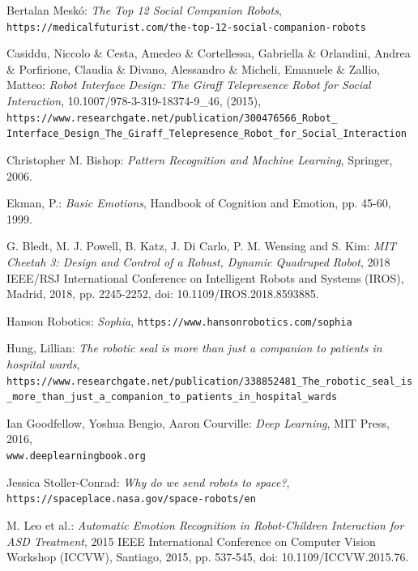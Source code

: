 \documentclass[runningheads,a4paper,12pt]{report}
\begin{document}
\begin{thebibliography}{9}

Bertalan Mesk\'o:
\textit{The Top 12 Social Companion Robots},
\texttt{https://medicalfuturist.com/the-top-12-social-companion-robots}

Casiddu, Niccolo \& Cesta, Amedeo \& Cortellessa, Gabriella \& Orlandini, Andrea \& Porfirione, Claudia \& Divano, Alessandro \& Micheli, Emanuele \& Zallio, Matteo: 
\textit{Robot Interface Design: The Giraff Telepresence Robot for Social Interaction}, 10.1007/978-3-319-18374-9\_46, (2015),
\texttt{https://www.researchgate.net/publication/300476566\_Robot\_
Interface\_Design\_The\_Giraff\_Telepresence\_Robot\_for\_Social\_Interaction}

Christopher M. Bishop:
\textit{Pattern Recognition and Machine Learning}, 
Springer,
2006.

Ekman, P.: 
\textit{Basic Emotions}, Handbook of Cognition and Emotion, pp. 45-60, 1999.

G. Bledt, M. J. Powell, B. Katz, J. Di Carlo, P. M. Wensing and S. Kim:
\textit{MIT Cheetah 3: Design and Control of a Robust, Dynamic Quadruped Robot}, 
2018 IEEE/RSJ International Conference on Intelligent Robots and Systems (IROS), Madrid, 2018, pp. 2245-2252, doi: 10.1109/IROS.2018.8593885.

Hanson Robotics:
\textit{Sophia},
\texttt{https://www.hansonrobotics.com/sophia}

Hung, Lillian:
\textit{The robotic seal is more than just a companion to patients in hospital wards}, \texttt{https://www.researchgate.net/publication/338852481\_The\_robotic\_seal\_is\_more\_than\_just\_a\_companion\_to\_patients\_in\_hospital\_wards}

Ian Goodfellow, Yoshua Bengio, Aaron Courville:
\textit{Deep Learning},
MIT Press,
2016,
\\\texttt{www.deeplearningbook.org}

Jessica Stoller-Conrad:
\textit{Why do we send robots to space?}, 
\texttt{https://spaceplace.nasa.gov/space-robots/en}

M. Leo et al.:
\textit{Automatic Emotion Recognition in Robot-Children Interaction for ASD Treatment},
2015 IEEE International Conference on Computer Vision Workshop (ICCVW), Santiago, 2015, pp. 537-545, doi: 10.1109/ICCVW.2015.76.


\end{thebibliography}
\end{document}
